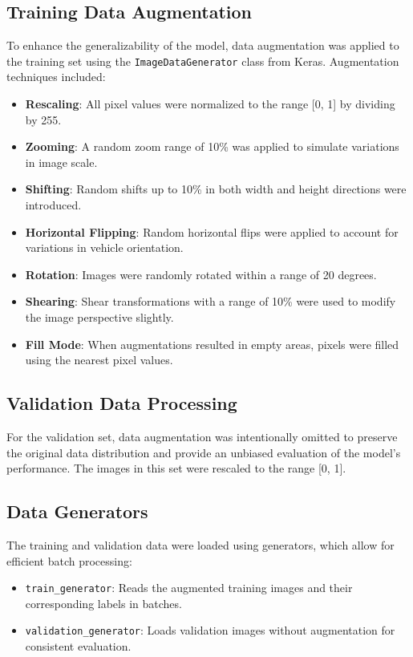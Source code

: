 \documentclass{article}
\begin{document}
\subsection{Training Data Augmentation}

To enhance the generalizability of the model, data augmentation was applied to the training set using the \texttt{ImageDataGenerator} class from Keras. Augmentation techniques included:

\begin{itemize}
    \item \textbf{Rescaling}: All pixel values were normalized to the range [0, 1] by dividing by 255.
    \item \textbf{Zooming}: A random zoom range of 10\% was applied to simulate variations in image scale.
    \item \textbf{Shifting}: Random shifts up to 10\% in both width and height directions were introduced.
    \item \textbf{Horizontal Flipping}: Random horizontal flips were applied to account for variations in vehicle orientation.
    \item \textbf{Rotation}: Images were randomly rotated within a range of 20 degrees.
    \item \textbf{Shearing}: Shear transformations with a range of 10\% were used to modify the image perspective slightly.
    \item \textbf{Fill Mode}: When augmentations resulted in empty areas, pixels were filled using the nearest pixel values.
\end{itemize}

\subsection{Validation Data Processing}

For the validation set, data augmentation was intentionally omitted to preserve the original data distribution and provide an unbiased evaluation of the model's performance. The images in this set were rescaled to the range [0, 1].

\subsection{Data Generators}

The training and validation data were loaded using generators, which allow for efficient batch processing:
\begin{itemize}
    \item \texttt{train\_generator}: Reads the augmented training images and their corresponding labels in batches.
    \item \texttt{validation\_generator}: Loads validation images without augmentation for consistent evaluation.
\end{itemize}
\end{document}
